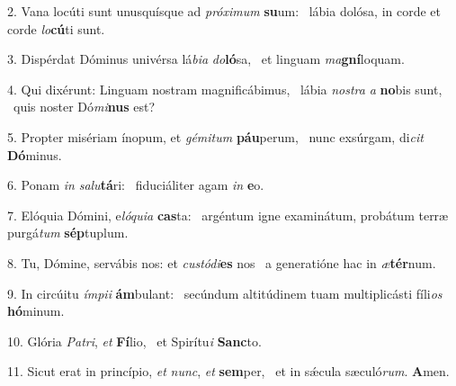 2. Vana locúti sunt unusquísque ad \textit{pró}\textit{xi}\textit{mum} \textbf{su}um: \ast\  lábia dolósa, in corde et corde \textit{lo}\textbf{cú}ti sunt.\

3. Dispérdat Dóminus univérsa lá\textit{bi}\textit{a} \textit{do}\textbf{ló}sa, \ast\  et linguam \textit{ma}\textbf{gní}loquam.\

4. Qui dixérunt: Linguam nostram magnificábimus, \dag\  lábia \textit{nos}\textit{tra} \textit{a} \textbf{no}bis sunt, \ast\  quis noster Dó\textit{mi}\textbf{nus} est?\

5. Propter misériam ínopum, et \textit{gé}\textit{mi}\textit{tum} \textbf{páu}perum, \ast\  nunc exsúrgam, di\textit{cit} \textbf{Dó}minus.\

6. Ponam \textit{in} \textit{sa}\textit{lu}\textbf{tá}ri: \ast\  fiduciáliter agam \textit{in} \textbf{e}o.\

7. Elóquia Dómini, e\textit{ló}\textit{qui}\textit{a} \textbf{cas}ta: \ast\  argéntum igne examinátum, probátum terræ purgá\textit{tum} \textbf{sép}tuplum.\

8. Tu, Dómine, servábis nos: et \textit{cus}\textit{tó}\textit{di}\textbf{es} nos \ast\  a generatióne hac in \textit{æ}\textbf{tér}num.\

9. In circúitu \textit{ím}\textit{pi}\textit{i} \textbf{ám}bulant: \ast\  secúndum altitúdinem tuam multiplicásti fíli\textit{os} \textbf{hó}minum.\

10. Glória \textit{Pa}\textit{tri}, \textit{et} \textbf{Fí}lio, \ast\  et Spirítu\textit{i} \textbf{Sanc}to.\

11. Sicut erat in princípio, \textit{et} \textit{nunc}, \textit{et} \textbf{sem}per, \ast\  et in sǽcula sæculó\textit{rum}. \textbf{A}men.\

